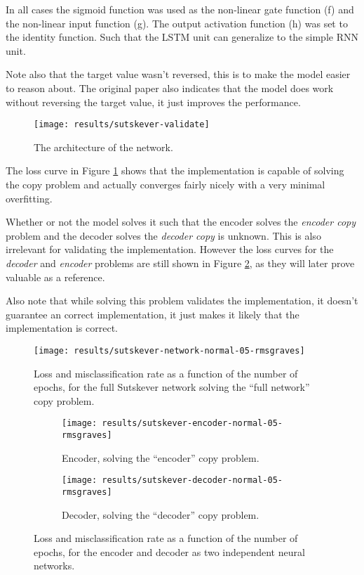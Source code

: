 In all cases the sigmoid function was used as the non-linear gate function (f) and the non-linear input function (g). The output activation function (h) was set to the identity function. Such that the LSTM unit can generalize to the simple RNN unit.

Note also that the target value wasn't reversed, this is to make the model easier to reason about. The original paper \cite{sutskever} also indicates that the model does work without reversing the target value, it just improves the performance.

\begin{figure}[H]
	\centering
	\texttt{[image: results/sutskever-validate]}
	\caption{The architecture of the network.}
\end{figure}

The loss curve in Figure \ref{fig:results:sutskever:network-05} shows that the implementation is capable of solving the copy problem and actually converges fairly nicely with a very minimal overfitting.

Whether or not the model solves it such that the encoder solves the \textit{encoder copy} problem and the decoder solves the \textit{decoder copy} is unknown. This is also irrelevant for validating the implementation. However the loss curves for the \textit{decoder} and \textit{encoder} problems are still shown in Figure \ref{fig:results:sutskever:decoder-encoder-05}, as they will later prove valuable as a reference.

Also note that while solving this problem validates the implementation, it doesn't guarantee an correct implementation, it just makes it likely that the implementation is correct.

\begin{figure}[h]
         \vspace*{-0.5cm}
	\centering
	\texttt{[image: results/sutskever-network-normal-05-rmsgraves]}
	\caption{Loss and misclassification rate as a function of the number of epochs, for the full Sutskever network solving the ``full network'' copy problem.}
	\label{fig:results:sutskever:network-05}
\end{figure}
\begin{figure}[H]
        \vspace{-0.5cm}
        \centering
        \begin{subfigure}[b]{0.40\textwidth}
                \texttt{[image: results/sutskever-encoder-normal-05-rmsgraves]}
                \caption{Encoder, solving the ``encoder'' copy problem.}
        \end{subfigure}
        \hspace{0.10\textwidth}
        \begin{subfigure}[b]{0.40\textwidth}
                \texttt{[image: results/sutskever-decoder-normal-05-rmsgraves]}
                \caption{Decoder, solving the ``decoder'' copy problem.}
        \end{subfigure}
        \caption{Loss and misclassification rate as a function of the number of epochs, for the encoder and decoder as two independent neural networks.}
        \label{fig:results:sutskever:decoder-encoder-05}
\end{figure}

